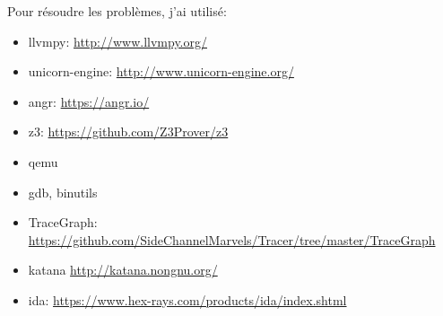 \documentclass[14pt]{article}
\theoremstyle{definition}
\begin{document}
Pour résoudre les problèmes, j'ai utilisé:
\begin{itemize}
\item llvmpy: \url{http://www.llvmpy.org/}
\item unicorn-engine: \url{http://www.unicorn-engine.org/}
\item angr: \url{https://angr.io/}
\item z3: \url{https://github.com/Z3Prover/z3}
\item qemu
\item gdb, binutils
\item TraceGraph: \url{https://github.com/SideChannelMarvels/Tracer/tree/master/TraceGraph}
\item katana \url{http://katana.nongnu.org/}
\item ida: \url{https://www.hex-rays.com/products/ida/index.shtml}
\end{itemize}
\end{document}

